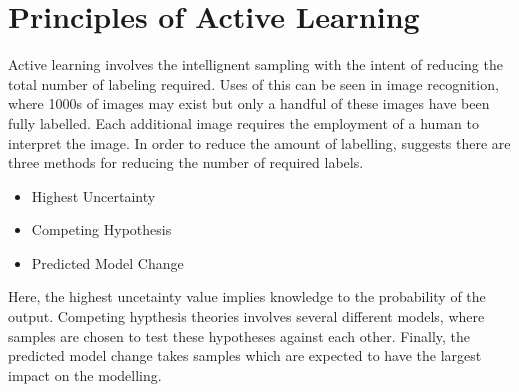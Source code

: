 \section{Principles of Active Learning}
Active learning involves the intellignent sampling with the intent of reducing the total number of labeling required. Uses of this can be seen in image recognition, where 1000s of images may exist but only a handful of these images have been fully labelled. Each additional image requires the employment of a human to interpret the image. In order to reduce the amount of labelling, \cite{activeLearning} suggests there are three methods for reducing the number of required labels.
\begin{itemize}
    \item Highest Uncertainty
    \item Competing Hypothesis
    \item Predicted Model Change
\end{itemize}
Here, the highest uncetainty value implies knowledge to the probability of the output. Competing hypthesis theories involves several different models, where samples are chosen to test these hypotheses against each other. Finally, the predicted model change takes samples which are expected to have the largest impact on the modelling.